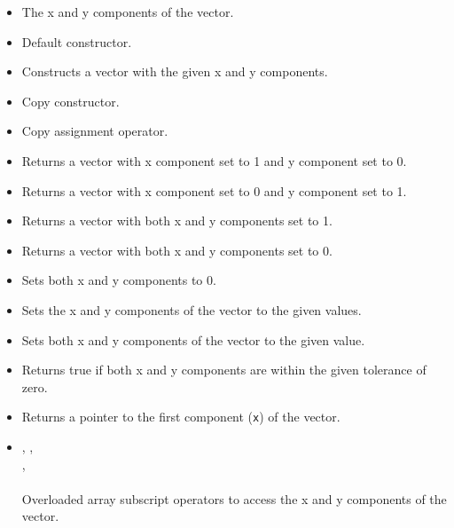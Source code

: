 \documentclass[a4paper,onecolumn,11pt]{doofus}
\begin{document}
\begin{itemize}
\item {} The x and y components of the vector.

\item {} Default constructor.

\item {} Constructs a vector with the given x and y components.

\item {} Copy constructor.

\item {} Copy assignment operator.

\item {} Returns a vector with x component set to 1 and y component set to 0.

\item {} Returns a vector with x component set to 0 and y component set to 1.

\item {} Returns a vector with both x and y components set to 1.

\item {} Returns a vector with both x and y components set to 0.

\item {} Sets both x and y components to 0.

\item {} Sets the x and y components of the vector to the given values.

\item {} Sets both x and y components of the vector to the given value.

\item {} Returns true if both x and y components are within the given tolerance of zero.

\item {} Returns a pointer to the first component (\texttt{x}) of the vector.

\item {}, ,\\ 
,\\ 
\\ 
Overloaded array subscript operators to access the x and y components of the vector.


\end{itemize}
\end{document}
